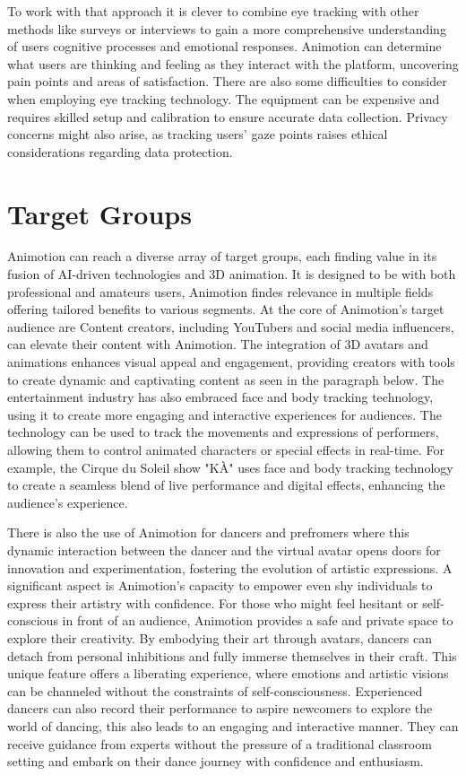 To work with that approach it is clever to combine eye tracking with other methods like surveys or interviews to gain a more comprehensive understanding of users
cognitive processes and emotional responses. Animotion can determine what users are thinking and feeling as they interact with the platform, 
uncovering pain points and areas of satisfaction. There are also some difficulties to consider when employing eye tracking technology. 
The equipment can be expensive and requires skilled setup and calibration to ensure accurate data collection. Privacy concerns might 
also arise, as tracking users' gaze points raises ethical considerations regarding data protection. \cite{eye2}

\section{Target Groups}
Animotion can reach a diverse array of target groups, each finding value in its fusion of AI-driven technologies 
and 3D animation. It is designed to be with both professional and amateurs users, Animotion findes relevance in multiple fields
offering tailored benefits to various segments.
At the core of Animotion's target audience are Content creators, including YouTubers and social media influencers, 
can elevate their content with Animotion. The integration of 3D avatars and animations enhances visual appeal 
and engagement, providing creators with tools to create dynamic and captivating content as seen in the paragraph below.
The entertainment industry has also embraced face and body tracking technology, using it to create more engaging and 
interactive experiences for audiences. The technology can be used to track the movements and expressions of performers, 
allowing them to control animated characters or special effects in real-time. For example, the Cirque du Soleil show "KÀ" uses face and body 
tracking technology to create a seamless blend of live performance and digital effects, enhancing the audience's experience. \cite{cirque}

There is also the use of Animotion for dancers and prefromers where this dynamic interaction between the dancer and the 
virtual avatar opens doors for innovation and experimentation, fostering the evolution of artistic expressions. A significant aspect 
is Animotion's capacity to empower even shy individuals to express their artistry with confidence. For those who might feel hesitant 
or self-conscious in front of an audience, Animotion provides a safe and private space to explore their creativity. By embodying 
their art through avatars, dancers can detach from personal inhibitions and fully immerse themselves in their craft. 
This unique feature offers a liberating experience, where emotions and artistic visions can be channeled without the constraints of self-consciousness.
Experienced dancers can also record their performance to aspire newcomers to explore the world of dancing, this also leads to an engaging and interactive manner.
They can receive guidance from experts without the pressure of a traditional classroom setting and embark on their dance journey with confidence and enthusiasm.

